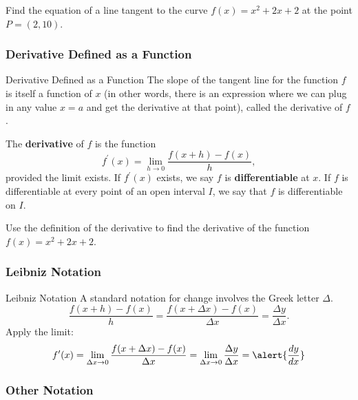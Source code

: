 \documentclass[Cal1Spr16Lectures.tex]{subfiles}
\begin{document}
\begin{frame}
\begin{exe} Find the equation of a line tangent to the curve $f(x)=x^2+2x+2$ at the point $P=(2,10)$. \end{exe}
\end{frame}

\subsubsection{Derivative Defined as a Function}

\begin{frame}{\small Derivative Defined as a Function}\footnotesize
The slope of the tangent line for the function $f$ is itself a function of $x$ (in other words, there is an expression where we can plug in any value $x=a$ and get the derivative at that point), called the derivative of $f$.
\begin{dfn} The {\bf derivative} of $f$ is the function 
\[f^{\prime}(x)=\lim_{h \to 0} \frac{f(x+h)-f(x)}{h},\]
provided the limit exists.  If $f^{\prime}(x)$ exists, we say $f$ is {\bf differentiable} at $x$.  If $f$ is differentiable at every point of an open interval $I$, we say that $f$ is differentiable on $I$. \end{dfn}
\end{frame}

\begin{frame}
\begin{exe} Use the definition of the derivative to find the derivative of the function $f(x)=x^2+2x+2$. \end{exe}
\end{frame}

\subsubsection{Leibniz Notation}

\begin{frame}{\small Leibniz Notation}
A standard notation for change involves the Greek letter $\Delta$. 
\[\frac{f(x+h)-f(x)}{h}=\frac{f(x+\Delta x)-f(x)}{\Delta x}=\frac{\Delta y}{\Delta x}.\]
Apply the limit:
\[f^{\prime}(x)=\lim_{\Delta x \to 0} \frac{f(x+\Delta x)-f(x)}{\Delta x}=\lim_{\Delta x \to 0} \frac{\Delta y}{\Delta x}=\alert{\frac{dy}{dx}}\]
\end{frame}

\subsubsection{Other Notation}
\end{document}
